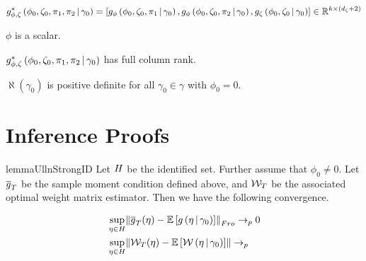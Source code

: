 \documentclass[11pt, letterpaper, twoside, final]{article}
\begin{document}
\begin{appendices}
    \begin{defn}{\popmom*}
        \begin{equation}
            g_{\phi, \zeta}^{*}\left(\phi_0, \zeta_0, \pi_1, \pi_2 \,\middle\vert\, \gamma_0\right)  =
            \left[g_{\phi}\left(\phi_0, \zeta_0, \pi_1 \,\middle\vert\, \gamma_0\right)  , g_{\phi}\left(\phi_0, \zeta_0,
            \pi_2 \,\middle\vert\, \gamma_0\right) , g_{\zeta} \left(\phi_0, \zeta_0 \,\middle\vert\, \gamma_0\right)  \right]  \in
            \mathbb{R}^{k \times (d_{\zeta} + 2)}
        \end{equation}
    \end{defn}


    \begin{assump}[GMM 4]\label{ass:GMM4}
    \begin{assumplist}
        \item $\phi$ is a scalar.
            \label{ass:GMM4a}
        \item $g_{\phi, \zeta}^{*}\left(\phi_0, \zeta_0, \pi_1, \pi_2 \,\middle\vert\, \gamma_0\right)$ has full column
            rank. 
            \label{ass:GMM4b}
        \item $\aleph(\gamma_0)$ is positive definite for all $\gamma_0 \in \gamma $ with $\phi_0 = 0$. 
            \label{ass:GMM4c}
    \end{assumplist}
    \end{assump}

\section{Inference Proofs}


\begin{restatable}{lemma}{UllnStrongID}
    \label{lemma:UniformConvergenceStrongID}
    Let $H$ be the identified set.
    Further assume that $\phi_0 \neq 0$. 
    Let $\overline{g}_T$ be the sample moment condition defined above, and $\mathcal{W}_T$ be the associated optimal weight matrix
    estimator.
    Then we have the following convergence.

    \begin{align}
        &\sup_{\eta \in \Eta} \norm*{\sampmom(\eta) - \E\left[g\left(\eta \mvert \gamma_0\right)\right]}_{Fro}
          \pto 0 \\ 
        &\sup_{\eta \in \Eta} \norm{\W_{T}(\eta)-\E\left[\W\left(\eta \mvert \gamma_0\right)\right]} \pto 
    \end{align}

\end{restatable}


\end{appendices}
\end{document}
